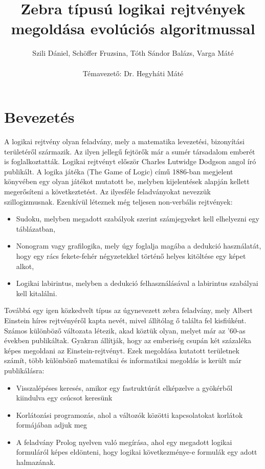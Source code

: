 \documentclass[12pt,a4paper,oneside]{report}
\author{Szili Dániel, Schöffer Fruzsina, Tóth Sándor Balázs, Varga Máté\\\ \\Témavezető: Dr. Hegyháti Máté}
\title{Zebra típusú logikai rejtvények megoldása evolúciós algoritmussal}
\begin{document}
\maketitle

\tableofcontents

\chapter{Bevezetés} %
	A logikai rejtvény olyan feladvány, mely a matematika levezetési, bizonyítási területéről származik.
    Az ilyen jellegű fejtörők már a sumér társadalom emberét is foglalkoztatták. Logikai rejtvényt először Charles Lutwidge Dodgson angol író publikált.
    A logika játéka (The Game of Logic) című 1886-ban megjelent könyvében egy olyan játékot mutatott be, melyben kijelentések alapján kellett megerősíteni a következtetést.
    Az ilyesféle feladványokat nevezzük szillogizmusnak.
    Ezenkívül léteznek még teljesen non-verbális rejtvények:
	\begin{itemize}
        \item Sudoku, melyben megadott szabályok szerint számjegyeket kell elhelyezni egy táblázatban,
        \item Nonogram vagy grafilogika, mely úgy foglalja magába a dedukció használatát, hogy egy rács fekete-fehér négyzetekkel történő helyes kitöltése egy képet alkot,
        \item Logikai labirintus, melyben a dedukció felhasználásával a labirintus szabályai kell kitalálni.
	\end{itemize}

	Továbbá egy igen közkedvelt típus az úgynevezett zebra feladvány, mely Albert Einstein híres rejtvényéről kapta nevét, mivel állítólag ő találta fel kisfiúként.
    Számos különböző változata létezik, akad köztük olyan, melyet már az ’60-as években publikáltak.
    Gyakran állítják, hogy az emberiség csupán két százaléka képes megoldani az Einstein-rejtvényt.
    Ezek megoldása kutatott területnek számít, több különböző matematikai és informatikai megoldás is került már publikálásra:
	\begin{itemize}
        \item Visszalépéses keresés, amikor egy fastruktúrát elképzelve a gyökérből kiindulva egy csúcsot keresünk
        \item Korlátozási programozás, ahol a változók közötti kapcsolatokat korlátok formájában adjuk meg
        \item A feladvány Prolog nyelven való megírása, ahol egy megadott logikai formuláról képes eldönteni, hogy logikai következménye-e formulák egy adott halmazának.
	\end{itemize}
\end{document}
